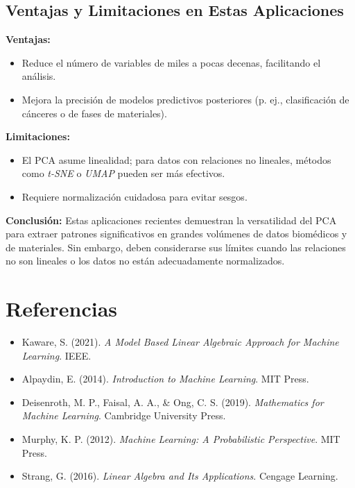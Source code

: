 \documentclass[12pt]{article}
\begin{document}
\subsection*{Ventajas y Limitaciones en Estas Aplicaciones}

\textbf{Ventajas:}
\begin{itemize}
	\item Reduce el número de variables de miles a pocas decenas, facilitando el análisis.
	\item Mejora la precisión de modelos predictivos posteriores (p. ej., clasificación de cánceres o de fases de materiales).
\end{itemize}

\textbf{Limitaciones:}
\begin{itemize}
	\item El PCA asume linealidad; para datos con relaciones no lineales, métodos como \emph{t-SNE} o \emph{UMAP} pueden ser más efectivos.
	\item Requiere normalización cuidadosa para evitar sesgos.
\end{itemize}

\vspace{1em}
\noindent
\textbf{Conclusión:} Estas aplicaciones recientes demuestran la versatilidad del PCA para extraer patrones significativos en grandes volúmenes de datos biomédicos y de materiales. Sin embargo, deben considerarse sus límites cuando las relaciones no son lineales o los datos no están adecuadamente normalizados.




	\newpage
	\section{Referencias}
	\begin{itemize}
		\item Kaware, S. (2021). \emph{A Model Based Linear Algebraic Approach for Machine Learning}. IEEE.
		
		\item Alpaydin, E. (2014). \emph{Introduction to Machine Learning}. MIT Press.
		
		\item Deisenroth, M. P., Faisal, A. A., \& Ong, C. S. (2019). \emph{Mathematics for Machine Learning}. Cambridge University Press.
		
		\item Murphy, K. P. (2012). \emph{Machine Learning: A Probabilistic Perspective}. MIT Press.
		
		\item Strang, G. (2016). \emph{Linear Algebra and Its Applications}. Cengage Learning.
	\end{itemize}
	
\end{document}
